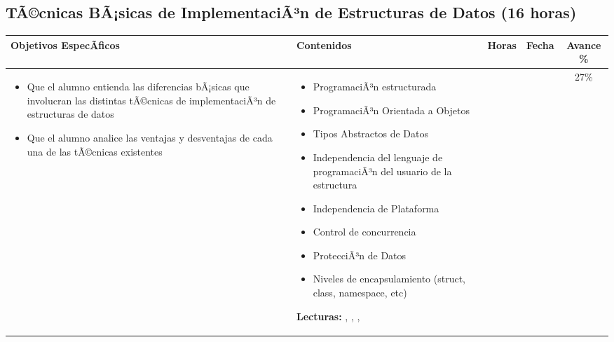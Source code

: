 \documentclass[a4paper]{article}
\newenvironment{unitgoals}
{ \begin{itemize} }
{ \end{itemize}   }
\newenvironment{topics}
{ \begin{itemize} }
{ \end{itemize}   }
\begin{document}
\subsection{TÃ©cnicas BÃ¡sicas de ImplementaciÃ³n de Estructuras de Datos (16 horas)}
\begin{tabularx}{\textwidth}{|X|X|c|c|c|}
\hline
\textbf{Objetivos EspecÃ­ficos} &   \textbf{Contenidos} & \textbf{Horas} & \textbf{Fecha} & \textbf{Avance \%}  \\ \hline
\begin{unitgoals}
         \item Que el alumno entienda las diferencias bÃ¡sicas que involucran las distintas tÃ©cnicas de implementaciÃ³n de estructuras de datos
         \item Que el alumno analice las ventajas y desventajas de cada una de las tÃ©cnicas existentes
   \end{unitgoals}      &
\begin{topics}
         \item ProgramaciÃ³n estructurada
         \item ProgramaciÃ³n Orientada a Objetos
         \item Tipos Abstractos de Datos
         \item Independencia del lenguaje de programaciÃ³n del usuario de la estructura
         \item Independencia de Plataforma
         \item Control de concurrencia
         \item ProtecciÃ³n de Datos
         \item Niveles de encapsulamiento (struct, class, namespace, etc)
   \end{topics}
{\bf Lecturas:} \cite{Cuadros2004Implementing}, \cite{Knuth2007TAOCP-V-I}, \cite{Knuth2007TAOCP-V-II}, \cite{Gamma94} &
&
&
27\%
\\
\hline
\end{tabularx}

\end{document}
